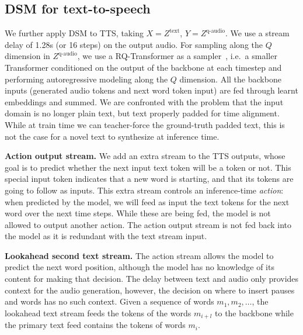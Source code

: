 \subsection{DSM for text-to-speech}
\label{sec:dsm_tts}
We further apply DSM to TTS, taking $X = Z^\text{text}$, $Y = Z^\text{q-audio}$. We use a stream delay of 1.28s (or 16 steps) on the output audio.
For sampling along the $Q$ dimension in $Z^\text{q-audio}$, we use a RQ-Transformer as a sampler~\citep{rq-transformer, moshi}, i.e.\ a smaller Transformer conditioned on the output of the backbone at each timestep and performing autoregressive modeling along the $Q$ dimension.
All the backbone inputs (generated audio tokens and next word token input) are fed through learnt embeddings and summed.
We are confronted with the problem that the input domain is no longer plain text, but text properly padded for time alignment.
While at train time we can teacher-force the ground-truth padded text, this is not the case for a novel text to synthesize at inference time.

\textbf{Action output stream.}
We add an extra stream to the TTS outputs,
whose goal is to predict whether the next input text token will be a  token or not. This special input token indicates that a new word is starting, and that its tokens are going to follow as inputs.
This extra stream controls an inference-time \emph{action}: when predicted by the model, we will feed as input the text tokens for the next word over the next time steps.
While these are being fed, the model is not allowed to output another  action. The action output stream is not fed back into the model as it is redundant with the text stream input.

\textbf{Lookahead second text stream.}
The action stream allows the model to predict the next word position,
although the model has no knowledge of its content for making that decision. The delay between text and audio only provides context for the audio generation, however, the decision on where to insert pauses and words has no such context. Given a sequence of words $m_1, m_2, \ldots$, the lookahead text stream feeds the tokens of the words $m_{i + l}$ to the backbone while the primary text feed contains the tokens of words $m_{i}$.

